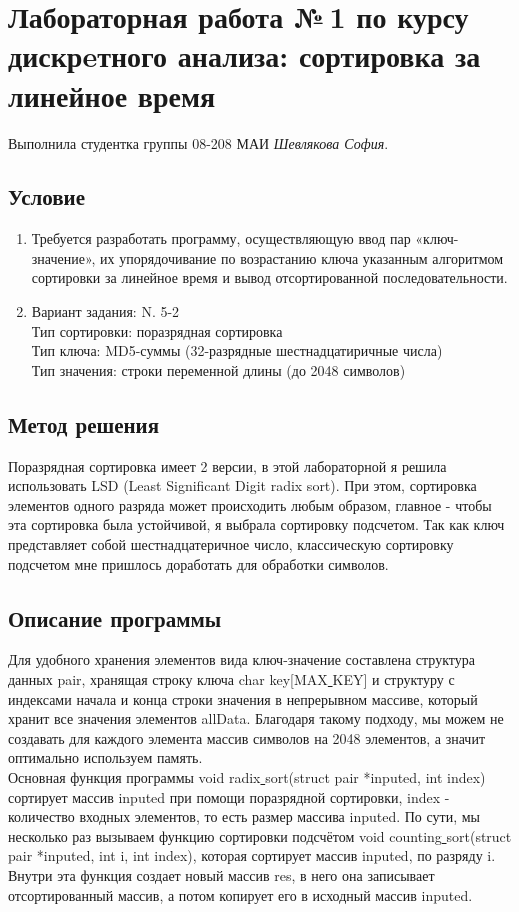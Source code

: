 \documentclass[12pt]{article}
\begin{document}
\section*{Лабораторная работа №\,1 по курсу дискрeтного анализа: сортировка за линейное время}

Выполнила студентка группы 08-208 МАИ \textit{Шевлякова София}.


\subsection*{Условие}

\begin{enumerate}
\item Требуется разработать программу, осуществляющую ввод пар «ключ-значение», их упорядочивание по возрастанию ключа указанным алгоритмом сортировки за линейное время и вывод отсортированной последовательности.
\item Вариант задания: N. 5-2 \\
Тип сортировки: поразрядная сортировка \\
Тип ключа: MD5-суммы (32-разрядные шестнадцатиричные числа) \\
Тип значения: строки переменной длины (до 2048 символов)
\end{enumerate} 


\subsection*{Метод решения}

Поразрядная сортировка имеет 2 версии, в этой лабораторной я решила использовать LSD (Least Significant Digit radix sort). При этом, сортировка элементов одного разряда может происходить любым образом, главное - чтобы эта сортировка была устойчивой, я выбрала сортировку подсчетом. Так как ключ представляет собой шестнадцатеричное число, классическую сортировку подсчетом мне пришлось доработать для обработки символов.


\subsection*{Описание программы}
Для удобного хранения элементов вида ключ-значение составлена структура данных pair, хранящая строку ключа char key[MAX\underline{ }KEY] и структуру с индексами начала и конца строки значения в непрерывном массиве, который хранит все значения элементов allData. Благодаря такому подходу, мы можем не создавать для каждого элемента массив символов на 2048 элементов, а значит оптимально используем память.\\
Основная функция программы void radix\underline{ }sort(struct pair *inputed, int index) сортирует массив inputed при помощи поразрядной сортировки, index - количество входных элементов, то есть размер массива inputed. По сути, мы несколько раз вызываем функцию сортировки подсчётом void counting\underline{ }sort(struct pair *inputed, int i, int index), которая сортирует массив inputed, по разряду i. Внутри эта функция создает новый массив res, в него она записывает отсортированный массив, а потом копирует его в исходный массив inputed.
\end{document}
